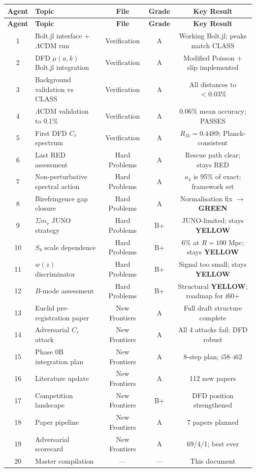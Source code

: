 \documentclass[11pt,a4paper]{article}
\newcommand{\GREEN}{\textcolor{dfdgreen}{\textbf{GREEN}}}
\newcommand{\YELLOW}{\textcolor{dfdyellow}{\textbf{YELLOW}}}
\begin{document}
\begin{center}
\begin{longtable}{clccc}
\toprule
\textbf{Agent} & \textbf{Topic} & \textbf{File} & \textbf{Grade} & \textbf{Key Result} \\
\midrule
\endfirsthead
\toprule
\textbf{Agent} & \textbf{Topic} & \textbf{File} & \textbf{Grade} & \textbf{Key Result} \\
\midrule
\endhead
1 & Bolt.jl interface + $\Lambda$CDM run & Verification & A & Working Bolt.jl; peaks match CLASS \\
2 & DFD $\mu(a,k)$ Bolt.jl integration & Verification & A & Modified Poisson + slip implemented \\
3 & Background validation vs CLASS & Verification & A & All distances to $< 0.03\%$ \\
4 & $\Lambda$CDM validation to 0.1\% & Verification & A & $0.06\%$ mean accuracy; PASSES \\
5 & First DFD $C_\ell$ spectrum & Verification & A & $R_{31} = 0.4489$; Planck-consistent \\
\midrule
6 & Last RED assessment & Hard Problems & A & Rescue path clear; stays RED \\
7 & Non-perturbative spectral action & Hard Problems & A & $a_4$ is 95\% of exact; framework set \\
8 & Birefringence gap closure & Hard Problems & A & Normalisation fix $\to$ \GREEN \\
9 & $\Sigma m_\nu$ JUNO strategy & Hard Problems & B+ & JUNO-limited; stays \YELLOW \\
10 & $S_8$ scale dependence & Hard Problems & B+ & 6\% at $R = 100$ Mpc; stays \YELLOW \\
11 & $w(z)$ discriminator & Hard Problems & B+ & Signal too small; stays \YELLOW \\
12 & $B$-mode assessment & Hard Problems & B+ & Structural \YELLOW; roadmap for i60+ \\
\midrule
13 & Euclid pre-registration paper & New Frontiers & A & Full draft structure complete \\
14 & Adversarial $C_\ell$ attack & New Frontiers & A & All 4 attacks fail; DFD robust \\
15 & Phase 0B integration plan & New Frontiers & A & 8-step plan; i58--i62 \\
16 & Literature update & New Frontiers & A & 112 new papers \\
17 & Competition landscape & New Frontiers & B+ & DFD position strengthened \\
18 & Paper pipeline & New Frontiers & A & 7 papers planned \\
19 & Adversarial scorecard & New Frontiers & A & 69/4/1; best ever \\
20 & Master compilation & --- & --- & This document \\
\bottomrule
\end{longtable}
\end{center}
\end{document}
